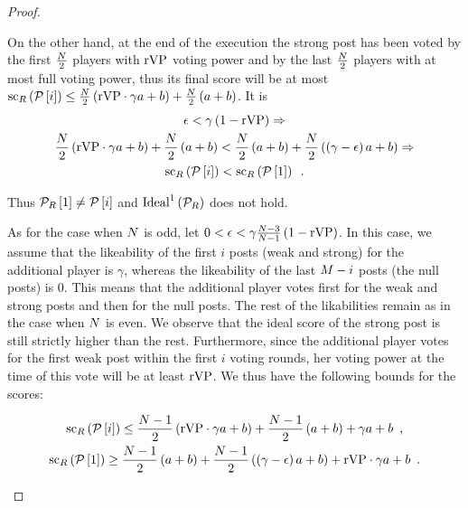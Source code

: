 \begin{proof}
\begin{itemize}
    On the other hand, at the end of the execution the strong post has been
    voted by the first $\frac{N}{2}$ players with $\mathrm{rVP}$
    voting power and by the last $\frac{N}{2}$ players with at most
    full voting power, thus its final score will be at most
    $\mathrm{sc}_{R}\left(\mathcal{P}\left[i\right]\right) \leq
    \frac{N}{2}\left(\mathrm{rVP} \cdot \gamma a + b\right) +
    \frac{N}{2}\left(a + b\right)$. It is
    \begin{gather*}
      \epsilon < \gamma\left(1 - \mathrm{rVP}\right) \Rightarrow \\
      \frac{N}{2}\left(\mathrm{rVP} \cdot \gamma a + b\right) +
      \frac{N}{2}\left(a + b\right) < \frac{N}{2}\left(a +
      b\right) + \frac{N}{2}\left(\left(\gamma - \epsilon\right) a +
      b\right) \Rightarrow \\
      \mathrm{sc}_{R}\left(\mathcal{P}\left[i\right]\right) <
      \mathrm{sc}_{R}\left(\mathcal{P}\left[1\right]\right) \enspace.
    \end{gather*}

    Thus $\mathcal{P}_{R}\left[1\right] \neq \mathcal{P}\left[i\right]$ and
    $\mathrm{Ideal}^1\left(\mathcal{P}_{R}\right)$ does not hold.

    As for the case when $N$ is odd, let $0 < \epsilon <
    \gamma\frac{N - 3}{N - 1}\left(1 - \mathrm{rVP}\right)$. In this
    case, we assume that the likeability of the first $i$ posts (weak and
    strong) for the additional player is $\gamma$, whereas the likeability of
    the last $M - i$ posts (the null posts) is 0. This means that the
    additional player votes first for the weak and strong posts and then for the
    null posts. The rest of the likabilities remain as in the case when
    $N$ is even. We observe that the ideal score of the strong post is
    still strictly higher than the rest. Furthermore, since the additional
    player votes for the first weak post within the first $i$ voting rounds, her
    voting power at the time of this vote will be at least $\mathrm{rVP}$. We thus have
    the following bounds for the scores:

    \begin{gather*}
      \mathrm{sc}_{R}\left(\mathcal{P}\left[i\right]\right) \leq
      \frac{N - 1}{2}\left(\mathrm{rVP} \cdot \gamma a + b\right) +
      \frac{N - 1}{2}\left(a + b\right) + \gamma a + b \enspace, \\
      \mathrm{sc}_{R}\left(\mathcal{P}\left[1\right]\right) \geq
      \frac{N - 1}{2}\left(a + b\right) + \frac{N -
      1}{2}\left(\left(\gamma - \epsilon\right) a + b\right) + \mathrm{rVP} \cdot \gamma
      a + b \enspace.
    \end{gather*}


\end{itemize}
\end{proof}
